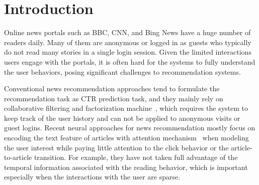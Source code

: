 \section{Introduction}
Online news portals such as BBC, CNN, and Bing News have a huge number 
of readers daily. Many of them are anonymous or logged in as guests who 
typically do not read many stories in a single login session.
Given the limited interactions users engage with the portals, it is often 
hard for the systems to fully understand the user behaviors, 
posing significant challenges to recommendation systems. 

Conventional news recommendation approaches tend to formulate the 
recommendation task as CTR prediction task, and they mainly rely on 
collaborative filtering and factorization machine~\cite{cheng2016wide,guodeepfm2017,wang2018modeling,ge2020graph,hu2020graph,xie2020deep}, 
which requires the system to keep track of the user history 
and can not be applied to anonymous visits or guest logins. 
Recent neural approaches for news recommendation mostly focus on 
encoding the text feature of articles with 
attention mechanism~\cite{wang2018dkn,zhu2019dan,wu_neural_2019-1,wu2019npa,wang2020fine,wu2020CPRS} 
when modeling the user interest while paying little attention to the click 
behavior or the article-to-article transition. 
For example, they have not taken full advantage of the temporal information 
associated with the reading behavior, which is important
especially when the interactions with the user are sparse.

